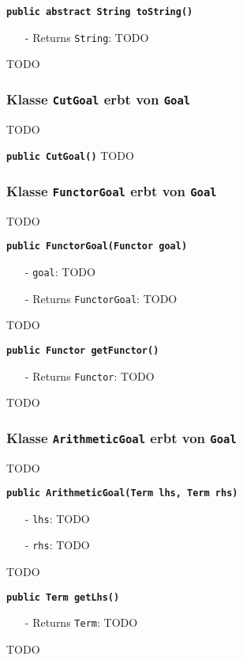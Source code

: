 \documentclass[parskip=full,11pt,twoside]{scrartcl}
\begin{document}
\textbf{\texttt{public abstract String toString()}}
\begin{itemize}[noitemsep]
	\item[-] Returns \texttt{String}: TODO
\end{itemize}
TODO

\subsubsection{Klasse \texttt{CutGoal} erbt von \texttt{Goal}}
TODO

\textbf{\texttt{public CutGoal()}}
TODO

\subsubsection{Klasse \texttt{FunctorGoal} erbt von \texttt{Goal}}
TODO

\textbf{\texttt{public FunctorGoal(Functor goal)}}
\begin{itemize}[noitemsep]
	\item[-] \texttt{goal}: TODO
	\item[-] Returns \texttt{FunctorGoal}: TODO
\end{itemize}
TODO

\textbf{\texttt{public Functor getFunctor()}}
\begin{itemize}[noitemsep]
	\item[-] Returns \texttt{Functor}: TODO
\end{itemize}
TODO

\subsubsection{Klasse \texttt{ArithmeticGoal} erbt von \texttt{Goal}}
TODO

\textbf{\texttt{public ArithmeticGoal(Term lhs, Term rhs)}}
\begin{itemize}[noitemsep]
	\item[-] \texttt{lhs}: TODO
	\item[-] \texttt{rhs}: TODO
\end{itemize}
TODO

\textbf{\texttt{public Term getLhs()}}
\begin{itemize}[noitemsep]
	\item[-] Returns \texttt{Term}: TODO
\end{itemize}
TODO
\end{document}
